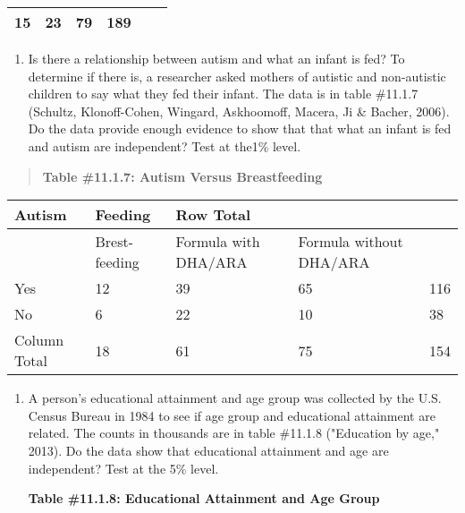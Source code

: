 \documentclass[]{book}
\providecommand{\tightlist}{%
  \setlength{\itemsep}{0pt}\setlength{\parskip}{0pt}}
\begin{document}
\begin{longtable}[]{@{}llllll@{}}
\begin{minipage}[t]{0.09\columnwidth}
15\strut
\end{minipage} & \begin{minipage}[t]{0.14\columnwidth}\raggedright
23\strut
\end{minipage} & \begin{minipage}[t]{0.12\columnwidth}\raggedright
79\strut
\end{minipage} & \begin{minipage}[t]{0.07\columnwidth}\raggedright
189\strut
\end{minipage}\tabularnewline
\bottomrule
\end{longtable}

\begin{enumerate}
\def\labelenumi{\arabic{enumi}.}
\setcounter{enumi}{2}
\tightlist
\item
  Is there a relationship between autism and what an infant is fed? To determine if there is, a researcher asked mothers of autistic and non-autistic children to say what they fed their infant. The data is in table \#11.1.7 (Schultz, Klonoff-Cohen, Wingard, Askhoomoff, Macera, Ji \& Bacher, 2006). Do the data provide enough evidence to show that that what an infant is fed and autism are independent? Test at the1\% level.
\end{enumerate}

\begin{quote}
\textbf{Table \#11.1.7: Autism Versus Breastfeeding}
\end{quote}

\begin{longtable}[]{@{}lllll@{}}
\toprule
Autism & Feeding & Row Total & &\tabularnewline
\midrule
\endhead
& Brest-feeding & Formula with DHA/ARA & Formula without DHA/ARA &\tabularnewline
Yes & 12 & 39 & 65 & 116\tabularnewline
No & 6 & 22 & 10 & 38\tabularnewline
Column Total & 18 & 61 & 75 & 154\tabularnewline
\bottomrule
\end{longtable}

\begin{enumerate}
\def\labelenumi{\arabic{enumi}.}
\setcounter{enumi}{3}
\item
  A person's educational attainment and age group was collected by the U.S. Census Bureau in 1984 to see if age group and educational attainment are related. The counts in thousands are in table \#11.1.8 ("Education by age," 2013). Do the data show that educational attainment and age are independent? Test at the 5\% level.

  \textbf{Table \#11.1.8: Educational Attainment and Age Group}
\end{enumerate}
\end{document}
